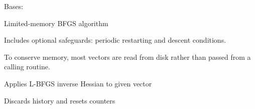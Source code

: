 \documentclass[letterpaper,10pt,english]{sphinxmanual}
\begin{document}
\begin{fulllineitems}
\label{\detokenize{ref/seisflows.plugins.optimize:seisflows.plugins.optimize.LBFGS.LBFGS}}
Bases: 

Limited-memory BFGS algorithm

Includes optional safeguards: periodic restarting and descent
conditions.

To conserve memory, most vectors are read from disk rather than
passed from a calling routine.

\begin{fulllineitems}
\label{\detokenize{ref/seisflows.plugins.optimize:seisflows.plugins.optimize.LBFGS.LBFGS.apply}}
Applies L-BFGS inverse Hessian to given vector

\end{fulllineitems}


\begin{fulllineitems}
\label{\detokenize{ref/seisflows.plugins.optimize:seisflows.plugins.optimize.LBFGS.LBFGS.check_status}}
\end{fulllineitems}


\begin{fulllineitems}
\label{\detokenize{ref/seisflows.plugins.optimize:seisflows.plugins.optimize.LBFGS.LBFGS.restart}}
Discards history and resets counters


\end{fulllineitems}
\end{fulllineitems}
\end{document}
